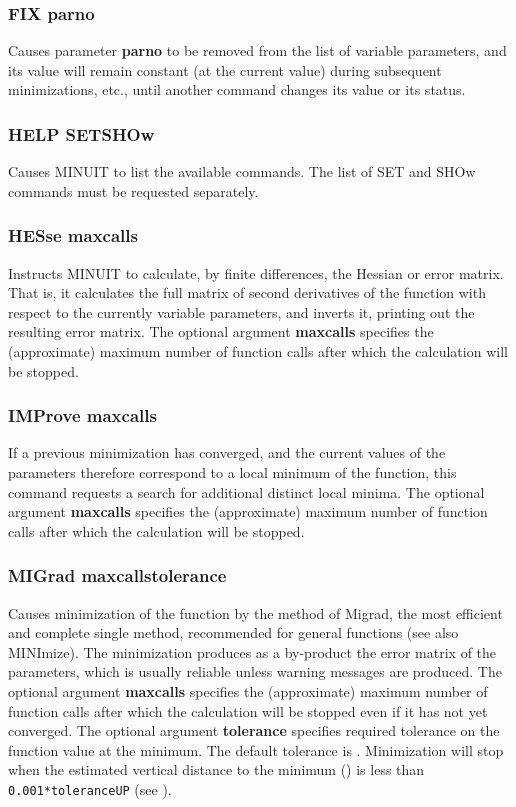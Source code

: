 \subsubsection*{FIX  parno}
\par
Causes parameter {\bf parno} to be removed from the list of variable
parameters, and its value will remain constant (at the current value)
during subsequent minimizations, etc., until another command changes
its value or its status.
\subsubsection*{HELP \lsb SET\rsb  \lsb SHOw\rsb }
\par
Causes MINUIT to list the available commands. The list of
SET and SHOw commands must be requested separately.
\subsubsection*{HESse  \lsb maxcalls\rsb }
\par
Instructs MINUIT to calculate, by finite differences, the Hessian or
error matrix. That is, it calculates the full matrix of second
derivatives of the function with respect to the currently variable
parameters, and inverts it, printing out the resulting error matrix.
The optional argument {\bf \lsb maxcalls\rsb } specifies the (approximate) maximum
number of function calls after which the calculation will be stopped.
\subsubsection*{IMProve  \lsb maxcalls\rsb }
\par
If a previous minimization has converged, and the current values
of the parameters therefore correspond to a local minimum of the function,
this command requests a search for additional distinct local minima.
The optional argument {\bf \lsb maxcalls\rsb } specifies the (approximate) maximum
number of function calls after which the calculation will be stopped.
\subsubsection*{MIGrad  \lsb maxcalls\rsb   \lsb tolerance\rsb }
\par
Causes minimization of the function by the method of Migrad, the most
efficient and complete single method, recommended for general functions
(see also MINImize).
The minimization produces as a by-product the error matrix
of the parameters, which is usually reliable unless warning messages
are produced.
The optional argument {\bf \lsb maxcalls\rsb } specifies the (approximate) maximum
number of function calls after which the calculation will be stopped
even if it has not yet converged.
The optional argument {\bf \lsb tolerance\rsb } specifies required tolerance on the
function value at the minimum.  
The default tolerance is .
Minimization will stop when the estimated vertical distance to
the minimum () is less than {\tt 0.001*\lsb tolerance\rsb *UP} 
(see ).


